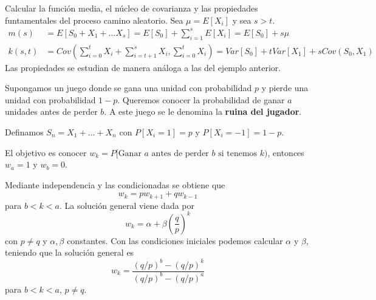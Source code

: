 \documentclass[PREyA.tex]{subfiles}
\begin{document}
\begin{example}
Calcular la función media, el núcleo de covarianza y las propiedades funtamentales del proceso camino aleatorio. Sea $\mu = E[X_i]$ y sea $s>t$.
\begin{align*}
m(s) &= E[S_0 +X_1 + \dotsc X_s] = E[S_0] + \sum_{i=1}^s E[X_i] = E[S_0] + s\mu\\
k(s,t) &=  Cov\left(\sum_{i=0}^t X_i + \sum_{i=t+1}^s X_i,\sum_{i=0}^t X_i \right) = Var[S_0] + tVar[X_1]+sCov(S_0,X_1)
\end{align*}
Las propiedades se estudian de manera análoga a las del ejemplo anterior.
\end{example}
\begin{defi} Supongamos un juego donde se gana una unidad con probabilidad $p$ y pierde una unidad con probabilidad $1-p$. Queremos conocer la probabilidad de ganar $a$ unidades antes de perder $b$. A este juego se le denomina la \textbf{ruina del jugador}.

Definamos $S_n = X_1 + \dotsc + X_n$ con $P[X_i = 1] = p$ y $P[X_i=-1] = 1-p$.

El objetivo es conocer $w_k = P[\text{Ganar $a$ antes de perder $b$ si tenemos $k$})$, entonces $w_a =1$ y $w_b = 0$. 
\end{defi}

\begin{prop}
Mediante independencia y las condicionadas se obtiene que
$$
w_k = pw_{k+1} + qw_{k-1} 
$$
para $b<k<a$. La solución general viene dada por
$$
w_k  = \alpha + \beta \left(\frac{q}{p}\right)^k 
$$
con $p \neq q$ y $\alpha,\beta$ constantes. Con las condiciones iniciales podemos calcular $\alpha$ y $\beta$, teniendo que la solución general es
$$
w_k = \frac{(q/p)^b - (q/p)^k}{(q/p)^b-(q/p)^a}
$$
para $b<k<a$, $p \neq q$.


\end{prop}
\end{document}
